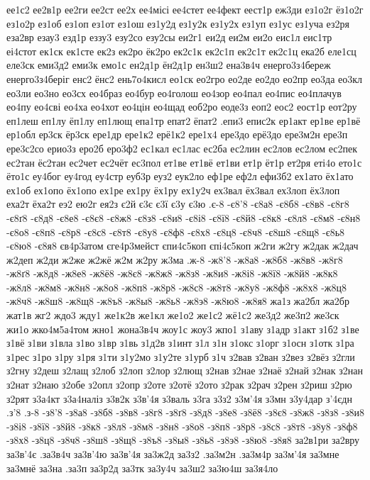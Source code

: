 {{ее1с2
ее2в1р
ее2ги
ее2ст
ее2х
ее4місі
ее4стет
ее4фект
еест1р
еж3ди
ез1о2г
ёз1о2г
ез1о2р
ез1об
ез1оп
ез1от
ез1ош
ез1у2д
ез1у2к
ез1у2х
ез1уп
ез1ус
ез1уча
ез2ря
еза2вр
езау3
езд1р
еззу3
езу2со
езу2сы
еи2г1
еи2д
еи2м
еи2о
еис1л
еис1тр
еі4стот
ек1ск
ек1сте
ек2з
ек2ро
ёк2ро
ек2с1к
ек2с1п
ек2с1т
ек2с1ц
ека2б
еле1сц
еле3ск
еми3д2
еми3к
емо1с
ен2д1р
ён2д1р
ен3ш2
ена3в4ч
енерго3з4береж
енерго3з4беріг
енс2
ёнс2
ень7о4кисл
ео1ск
ео2гро
ео2де
ео2до
ео2пр
ео3да
ео3кл
ео3ли
ео3но
ео3сх
ео4браз
ео4бур
ео4голош
ео4зор
ео4пал
ео4пис
ео4плачув
ео4пу
ео4сві
ео4ха
ео4хот
ео4цін
ео4щад
еоб2ро
еоде3з
еоп2
еос2
еост1р
еот2ру
еп1леш
еп1лу
ёп1лу
еп1лющ
епа1тр
епат2
ёпат2
.епи3
епис2к
ер1акт
ер1ве
ер1вё
ер1обл
ер3ск
ёр3ск
ере1др
ере1к2
ерё1к2
ере1х4
ере3до
ерё3до
ере3м2н
ере3п
ере3с2со
ерио3з
еро2б
еро3ф2
ес1кал
ес1лас
ес2ба
ес2лин
ес2лов
ес2лом
ес2пек
ес2тан
ёс2тан
ес2чет
ес2чёт
ес3пол
ет1ве
ет1вё
ет1ви
ет1р
ёт1р
ет2ря
еті4о
ето1с
ёто1с
еу4бог
еу4год
еу4стр
еуб3р
еуз2
еук2ло
еф1ре
еф2л
ефи3б2
ех1ато
ёх1ато
ех1об
ех1опо
ёх1опо
ех1ре
ех1ру
ёх1ру
ех1у2ч
ех3вал
ёх3вал
ех3лоп
ёх3лоп
еха2т
ёха2т
еэ2
ею2г
ея2з
є2й
є3є
є3ї
є3у
є3ю
.є-8
-є8'8
-є8а8
-є8б8
-є8в8
-є8г8
-є8ґ8
-є8д8
-є8е8
-є8є8
-є8ж8
-є8з8
-є8и8
-є8і8
-є8ї8
-є8й8
-є8к8
-є8л8
-є8м8
-є8н8
-є8о8
-є8п8
-є8р8
-є8с8
-є8т8
-є8у8
-є8ф8
-є8х8
-є8ц8
-є8ч8
-є8ш8
-є8щ8
-є8ь8
-є8ю8
-є8я8
єв4р3атом
єге4р3мейст
єпи4с5коп
єпі4с5коп
ж2ги
ж2гу
ж2дак
ж2дач
ж2деп
ж2ди
ж2же
ж2жё
ж2м
ж2ру
ж3ма
.ж-8
-ж8'8
-ж8а8
-ж8б8
-ж8в8
-ж8г8
-ж8ґ8
-ж8д8
-ж8е8
-ж8ё8
-ж8є8
-ж8ж8
-ж8з8
-ж8и8
-ж8і8
-ж8ї8
-ж8й8
-ж8к8
-ж8л8
-ж8м8
-ж8н8
-ж8о8
-ж8п8
-ж8р8
-ж8с8
-ж8т8
-ж8у8
-ж8ф8
-ж8х8
-ж8ц8
-ж8ч8
-ж8ш8
-ж8щ8
-ж8ъ8
-ж8ы8
-ж8ь8
-ж8э8
-ж8ю8
-ж8я8
жа1з
жа2бл
жа2бр
жат1в
жг2
ждо3
жду1
же1к2в
же1кл
же1о2
же1с2
жё1с2
же3д2
же3п2
же3ск
жи1о
жко4м5а4том
жно1
жона3в4ч
жоу1с
жоу3
жпо1
з1аву
з1адр
з1акт
з1б2
з1ве
з1вё
з1ви
з1вла
з1во
з1вр
з1вь
з1д2в
з1инт
з1л
з1н
з1окс
з1орг
з1осн
з1отк
з1ра
з1рес
з1ро
з1ру
з1ря
з1ти
з1у2мо
з1у2те
з1урб
з1ч
з2вав
з2ван
з2вез
з2вёз
з2гли
з2гну
з2деш
з2лащ
з2лоб
з2лоп
з2лор
з2лющ
з2нав
з2нае
з2наё
з2най
з2нак
з2нан
з2нат
з2наю
з2обе
з2опл
з2опр
з2оте
з2отё
з2ото
з2рак
з2рач
з2рен
з2риш
з2рю
з2рят
з3а4кт
з3а4наліз
з3в2к
з3в'4я
з3валь
з3га
з3з2
з3м'4я
з3мн
з3у4дар
з'4єдн
.з'8
.з-8
-з8'8
-з8а8
-з8б8
-з8в8
-з8г8
-з8ґ8
-з8д8
-з8е8
-з8ё8
-з8є8
-з8ж8
-з8з8
-з8и8
-з8і8
-з8ї8
-з8й8
-з8к8
-з8л8
-з8м8
-з8н8
-з8о8
-з8п8
-з8р8
-з8с8
-з8т8
-з8у8
-з8ф8
-з8х8
-з8ц8
-з8ч8
-з8ш8
-з8щ8
-з8ъ8
-з8ы8
-з8ь8
-з8э8
-з8ю8
-з8я8
за2в1ри
за2вру
за3в'4є
.за3в4ч
за3в'4ю
за3в'4я
за3ж2д
за3з2
.за3м2н
.за3м4р
за3м'4я
за3мне
за3мнё
за3на
.за3п
за3р2д
за3тк
за3у4ч
за3ш2
за3ю4ш
за3я4ло
}}

